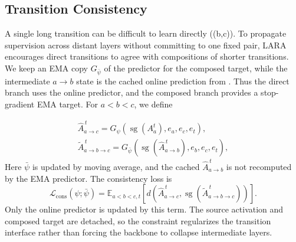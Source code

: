 \subsection{Transition Consistency}

A single long transition can be difficult to learn directly ((b,c)). To propagate supervision across distant layers without committing to one fixed pair, LARA encourages direct transitions to agree with compositions of shorter transitions. We keep an EMA copy $G_{\bar\psi}$ of the predictor for the composed target, while the intermediate $a\to b$ state is the cached online prediction from . Thus the direct branch uses the online predictor, and the composed branch provides a stop-gradient EMA target. For $a<b<c$, we define

\begin{equation}
\begin{aligned}
\widehat A_{a\to c}^{\,t}
=
G_\psi(\operatorname{sg}(A_a^t),e_a,e_c,e_t),
\\
\widetilde A_{a\to b\to c}^{\,t}
=
G_{\bar\psi}\!\left(
\operatorname{sg}(\widehat A_{a\to b}^{\,t}),
e_b,e_c,e_t
\right),
\end{aligned}
\label{eq:direct_transition}
\end{equation}
Here $\bar\psi$ is updated by moving average, and the cached $\widehat A_{a\to b}^{\,t}$ is not recomputed by the EMA predictor.
The consistency loss is
\begin{equation}
\mathcal{L}_{\mathrm{cons}}(\psi;\bar\psi)
=
\mathbb{E}_{a<b<c,t}
\left[
d\left(
\widehat A_{a\to c}^{\,t},
\operatorname{sg}(\widetilde A_{a\to b\to c}^{\,t})
\right)
\right].
\label{eq:consistency_loss}
\end{equation}
Only the online predictor is updated by this term. The source activation and composed target are detached, so the constraint regularizes the transition interface rather than forcing the backbone to collapse intermediate layers.



